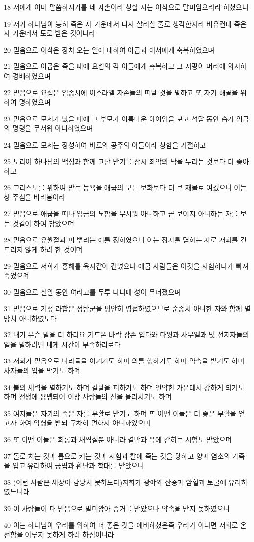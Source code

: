 \par 18 저에게 이미 말씀하시기를 네 자손이라 칭할 자는 이삭으로 말미암으리라 하셨으니
\par 19 저가 하나님이 능히 죽은 자 가운데서 다시 살리실 줄로 생각한지라 비유컨대 죽은 자 가운데서 도로 받은 것이니라
\par 20 믿음으로 이삭은 장차 오는 일에 대하여 야곱과 에서에게 축복하였으며
\par 21 믿음으로 야곱은 죽을 때에 요셉의 각 아들에게 축복하고 그 지팡이 머리에 의지하여 경배하였으며
\par 22 믿음으로 요셉은 임종시에 이스라엘 자손들의 떠날 것을 말하고 또 자기 해골을 위하여 명하였으며
\par 23 믿음으로 모세가 났을 때에 그 부모가 아름다운 아이임을 보고 석달 동안 숨겨 임금의 명령을 무서워 아니하였으며
\par 24 믿음으로 모세는 장성하여 바로의 공주의 아들이라 칭함을 거절하고
\par 25 도리어 하나님의 백성과 함께 고난 받기를 잠시 죄악의 낙을 누리는 것보다 더 좋아하고
\par 26 그리스도를 위하여 받는 능욕을 애굽의 모든 보화보다 더 큰 재물로 여겼으니 이는 상 주심을 바라봄이라
\par 27 믿음으로 애굽을 떠나 임금의 노함을 무서워 아니하고 곧 보이지 아니하는 자를 보는 것같이 하여 참았으며
\par 28 믿음으로 유월절과 피 뿌리는 예를 정하였으니 이는 장자를 멸하는 자로 저희를 건드리지 않게 하려 한 것이며
\par 29 믿음으로 저희가 홍해를 육지같이 건넜으나 애굽 사람들은 이것을 시험하다가 빠져 죽었으며
\par 30 믿음으로 칠일 동안 여리고를 두루 다니매 성이 무너졌으며
\par 31 믿음으로 기생 라합은 정탐군을 평안히 영접하였으므로 순종치 아니한 자와 함께 멸망치 아니하였도다
\par 32 내가 무슨 말을 더 하리요 기드온 바락 삼손 입다와 다윗과 사무엘과 및 선지자들의 일을 말하려면 내게 시간이 부족하리로다
\par 33 저희가 믿음으로 나라들을 이기기도 하며 의를 행하기도 하며 약속을 받기도 하며 사자들의 입을 막기도 하며
\par 34 불의 세력을 멸하기도 하며 칼날을 피하기도 하며 연약한 가운데서 강하게 되기도 하며 전쟁에 용맹되어 이방 사람들의 진을 물리치기도 하며
\par 35 여자들은 자기의 죽은 자를 부활로 받기도 하며 또 어떤 이들은 더 좋은 부활을 얻고자 하여 악형을 받되 구차히 면하지 아니하였으며
\par 36 또 어떤 이들은 희롱과 채찍질뿐 아니라 결박과 옥에 갇히는 시험도 받았으며
\par 37 돌로 치는 것과 톱으로 켜는 것과 시험과 칼에 죽는 것을 당하고 양과 염소의 가죽을 입고 유리하여 궁핍과 환난과 학대를 받았으니
\par 38 (이런 사람은 세상이 감당치 못하도다)저희가 광야와 산중과 암혈과 토굴에 유리하였느니라
\par 39 이 사람들이 다 믿음으로 말미암아 증거를 받았으나 약속을 받지 못하였으니
\par 40 이는 하나님이 우리를 위하여 더 좋은 것을 예비하셨은즉 우리가 아니면 저희로 온전함을 이루지 못하게 하려 하심이니라


